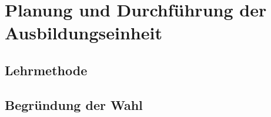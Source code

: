 \chapter{Planung und Durchführung der Ausbildungseinheit}

\section{Lehrmethode}

\section{Begründung der Wahl}
